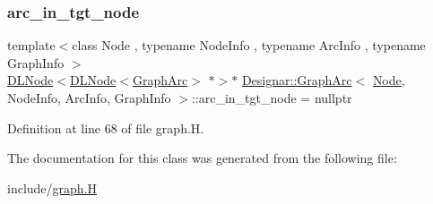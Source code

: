 \subsubsection{\texorpdfstring{arc\+\_\+in\+\_\+tgt\+\_\+node}{arc\_in\_tgt\_node}}
{\footnotesize\ttfamily template$<$class Node , typename Node\+Info , typename Arc\+Info , typename Graph\+Info $>$ \\
\hyperlink{class_designar_1_1_d_l_node}{D\+L\+Node}$<$\hyperlink{class_designar_1_1_d_l_node}{D\+L\+Node}$<$\hyperlink{class_designar_1_1_graph_arc}{Graph\+Arc}$>$ $\ast$$>$$\ast$ \hyperlink{class_designar_1_1_graph_arc}{Designar\+::\+Graph\+Arc}$<$ \hyperlink{namespace_designar_a5af326c65aa2bd26b26c410f2030d09e}{Node}, Node\+Info, Arc\+Info, Graph\+Info $>$\+::arc\+\_\+in\+\_\+tgt\+\_\+node = nullptr\hspace{0.3cm}{\ttfamily [protected]}}



Definition at line 68 of file graph.\+H.



The documentation for this class was generated from the following file\+:\begin{DoxyCompactItemize}
\item 
include/\hyperlink{graph_8_h}{graph.\+H}\end{DoxyCompactItemize}
